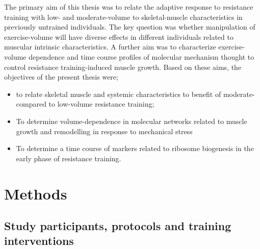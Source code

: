 \documentclass[twoside,10pt]{gihclass} %
\providecommand{\tightlist}{%
  \setlength{\itemsep}{0pt}\setlength{\parskip}{0pt}}
\begin{document}
The primary aim of this thesis was to relate the adaptive response to resistance training with low- and moderate-volume to skeletal-muscle characteristics in previously untrained individuals. The key question was whether manipulation of exercise-volume will have diverse effects in different individuals related to muscular intrinsic characteristics. A further aim was to characterize exercise-volume dependence and time course profiles of molecular mechanism thought to control resistance training-induced muscle growth. Based on these aims, the objectives of the present thesis were;
\begin{itemize}
\tightlist
\item
  to relate skeletal muscle and systemic characteristics to benefit of moderate- compared to low-volume resistance training;
\item
  To determine volume-dependence in molecular networks related to muscle growth and remodelling in response to mechanical stress
\item
  To determine a time course of markers related to ribosome biogenesis in the early phase of resistance training.
\end{itemize}
\hypertarget{methods}{%
\chapter{Methods}\label{methods}}

\hypertarget{study-participants-protocols-and-training-interventions}{%
\section{Study participants, protocols and training interventions}\label{study-participants-protocols-and-training-interventions}}
\end{document}
